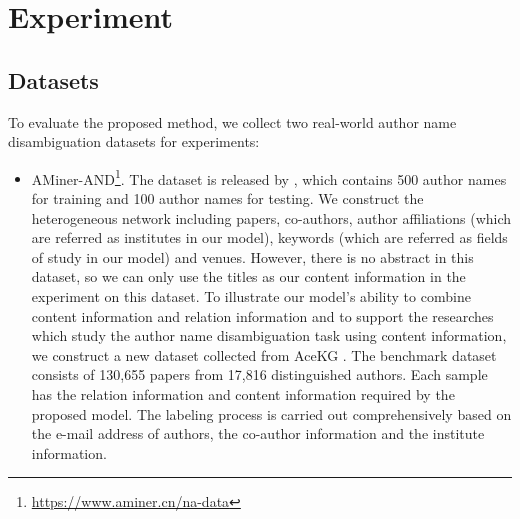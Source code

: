 \documentclass[letterpaper]{article} %
\begin{document}
\section{Experiment}
\subsection{Datasets}
To evaluate the proposed method, we collect two real-world author name disambiguation datasets for experiments:
\begin{itemize}
\item AMiner-AND\footnote{\small \url{https://www.aminer.cn/na-data}}.
The dataset is released by \cite{JieTang}, which contains 500 author names for training and 100 author names for testing. We construct the heterogeneous network including papers, co-authors, author affiliations (which are referred as institutes in our model), keywords (which are referred as fields of study in our model) and venues. However, there is no abstract in this dataset, so we can only use the titles as our content information in the experiment on this dataset.
To illustrate our model's ability to combine content information and relation information and to support the researches which study the author name disambiguation task using content information, we construct a new dataset collected from AceKG \cite{AceKG}. The benchmark dataset consists of 130,655 papers from 17,816 distinguished authors. Each sample has the relation information and content information required by the proposed model. The labeling process is carried out comprehensively based on the e-mail address of authors, the co-author information and the institute information.
\end{itemize}
\end{document}

